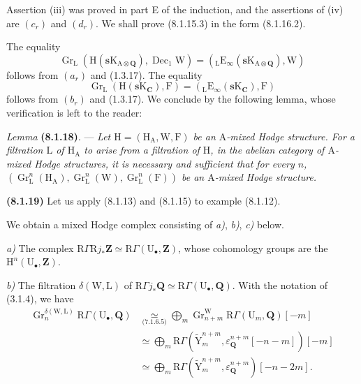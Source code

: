 \documentclass[11pt,leqno]{article}
\begin{document}
Assertion (iii) was proved in part E of the induction, and the assertions of (iv) are \((c_{r})\) and \((d_{r})\). We shall prove (8.1.15.3) in the form (8.1.16.2).

The equality
\[
\operatorname{Gr}_{\mathrm{L}}
(\mathrm{H}(\mathbf{s}\mathrm{K}_{\mathrm{A}\otimes\mathbf{Q}}),
\operatorname{Dec}_{1}\mathrm{W})
=
({}_{\mathrm{L}}\mathrm{E}_{\infty}
(\mathbf{s}\mathrm{K}_{\mathrm{A}\otimes\mathbf{Q}}),\mathrm{W})
\]
follows from \((a_{r})\) and (1.3.17). The equality
\[
\operatorname{Gr}_{\mathrm{L}}
(\mathrm{H}(\mathbf{s}\mathrm{K}_{\mathbf{C}}),\mathrm{F})
=
({}_{\mathrm{L}}\mathrm{E}_{\infty}
(\mathbf{s}\mathrm{K}_{\mathbf{C}}),\mathrm{F})
\]
follows from \((b_{r})\) and (1.3.17). We conclude by the following lemma, whose verification is left to the reader:

\textit{Lemma} \textbf{(8.1.18)}. — \textit{Let \(\mathrm{H}=(\mathrm{H}_{\mathrm{A}},\mathrm{W},\mathrm{F})\) be an \(\mathrm{A}\)-mixed Hodge structure. For a filtration \(\mathrm{L}\) of \(\mathrm{H}_{\mathrm{A}}\) to arise from a filtration of \(\mathrm{H}\), in the abelian category of \(\mathrm{A}\)-mixed Hodge structures, it is necessary and sufficient that for every \(n\), \((\operatorname{Gr}_{\mathrm{L}}^{n}(\mathrm{H}_{\mathrm{A}}),\operatorname{Gr}_{\mathrm{L}}^{n}(\mathrm{W}),\operatorname{Gr}_{\mathrm{L}}^{n}(\mathrm{F}))\) be an \(\mathrm{A}\)-mixed Hodge structure.}

\textbf{(8.1.19)} Let us apply (8.1.13) and (8.1.15) to example (8.1.12).

We obtain a mixed Hodge complex consisting of \textit{a)}, \textit{b)}, \textit{c)} below.

\textit{a)} The complex \(\mathrm{R}\Gamma\mathrm{R}j_{\ast}\mathbf{Z}\simeq\mathrm{R}\Gamma(\mathrm{U}_{\bullet},\mathbf{Z})\), whose cohomology groups are the \(\mathrm{H}^{n}(\mathrm{U}_{\bullet},\mathbf{Z})\).

\textit{b)} The filtration \(\delta(\mathrm{W},\mathrm{L})\) of \(\mathrm{R}\Gamma j_{\ast}\mathbf{Q}\simeq\mathrm{R}\Gamma(\mathrm{U}_{\bullet},\mathbf{Q})\). With the notation of (3.1.4), we have
\begin{align*}
\operatorname{Gr}_{n}^{\delta(\mathrm{W},\mathrm{L})}
\mathrm{R}\Gamma(\mathrm{U}_{\bullet},\mathbf{Q})
&\underset{\text{(7.1.6.5)}}{\simeq}
\bigoplus_m
\operatorname{Gr}_{n+m}^{\mathrm{W}}
\mathrm{R}\Gamma(\mathrm{U}_{m},\mathbf{Q})[-m]
\\
&\simeq
\bigoplus_m
\mathrm{R}\Gamma
(\widetilde{\mathrm{Y}}_{m}^{n+m},
\varepsilon_{\mathbf{Q}}^{n+m}[-n-m])[-m]
\\
&\simeq
\bigoplus_m
\mathrm{R}\Gamma
(\widetilde{\mathrm{Y}}_{m}^{n+m},
\varepsilon_{\mathbf{Q}}^{n+m})[-n-2m].
\end{align*}
\end{document}
